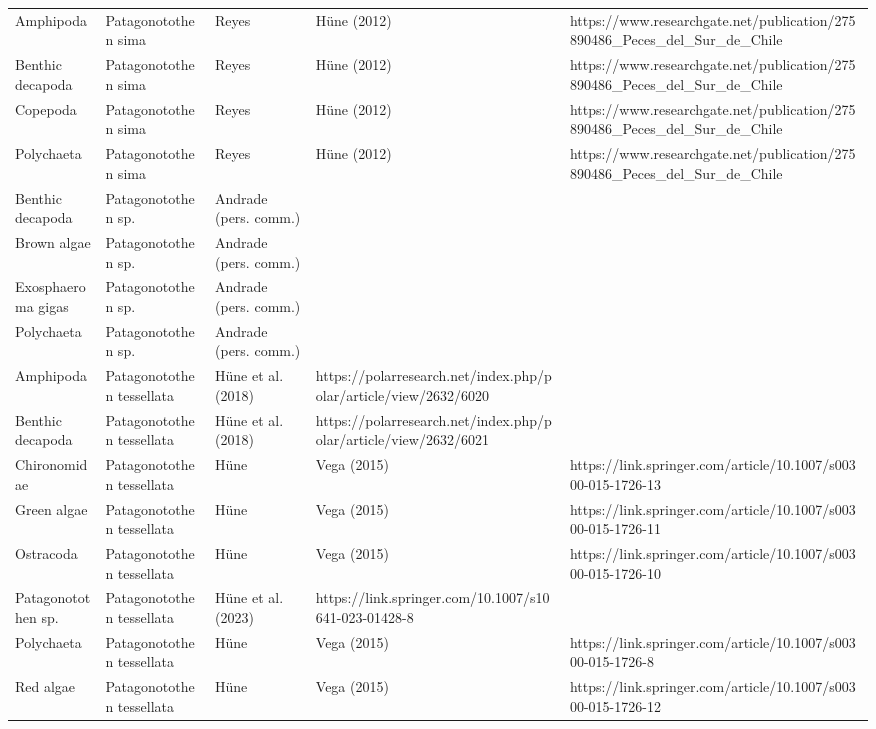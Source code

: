 \documentclass[
]{article}
\begin{document}
\begin{landscape}
\begin{longtable}[t]{>{\raggedright\arraybackslash}p{4cm}>{\centering\arraybackslash}p{4cm}>{\centering\arraybackslash}p{6cm}>{\centering\arraybackslash}p{6cm}}
Amphipoda & Patagonotothen sima & \tiny Reyes & Hüne (2012) & \tiny https://www.researchgate.net/publication/275890486_Peces_del_Sur_de_Chile\\
Benthic decapoda & Patagonotothen sima & \tiny Reyes & Hüne (2012) & \tiny https://www.researchgate.net/publication/275890486_Peces_del_Sur_de_Chile\\
\addlinespace
Copepoda & Patagonotothen sima & \tiny Reyes & Hüne (2012) & \tiny https://www.researchgate.net/publication/275890486_Peces_del_Sur_de_Chile\\
Polychaeta & Patagonotothen sima & \tiny Reyes & Hüne (2012) & \tiny https://www.researchgate.net/publication/275890486_Peces_del_Sur_de_Chile\\
Benthic decapoda & Patagonotothen sp. & \tiny Andrade (pers. comm.) & \tiny\\
Brown algae & Patagonotothen sp. & \tiny Andrade (pers. comm.) & \tiny\\
Exosphaeroma gigas & Patagonotothen sp. & \tiny Andrade (pers. comm.) & \tiny\\
\addlinespace
Polychaeta & Patagonotothen sp. & \tiny Andrade (pers. comm.) & \tiny\\
Amphipoda & Patagonotothen tessellata & \tiny Hüne et al. (2018) & \tiny https://polarresearch.net/index.php/polar/article/view/2632/6020\\
Benthic decapoda & Patagonotothen tessellata & \tiny Hüne et al. (2018) & \tiny https://polarresearch.net/index.php/polar/article/view/2632/6021\\
Chironomidae & Patagonotothen tessellata & \tiny Hüne & Vega (2015) & \tiny https://link.springer.com/article/10.1007/s00300-015-1726-13\\
Green algae & Patagonotothen tessellata & \tiny Hüne & Vega (2015) & \tiny https://link.springer.com/article/10.1007/s00300-015-1726-11\\
\addlinespace
Ostracoda & Patagonotothen tessellata & \tiny Hüne & Vega (2015) & \tiny https://link.springer.com/article/10.1007/s00300-015-1726-10\\
Patagonotothen sp. & Patagonotothen tessellata & \tiny Hüne et al. (2023) & \tiny https://link.springer.com/10.1007/s10641-023-01428-8\\
Polychaeta & Patagonotothen tessellata & \tiny Hüne & Vega (2015) & \tiny https://link.springer.com/article/10.1007/s00300-015-1726-8\\
Red algae & Patagonotothen tessellata & \tiny Hüne & Vega (2015) & \tiny https://link.springer.com/article/10.1007/s00300-015-1726-12\\

\end{longtable}
\end{landscape}
\end{document}
